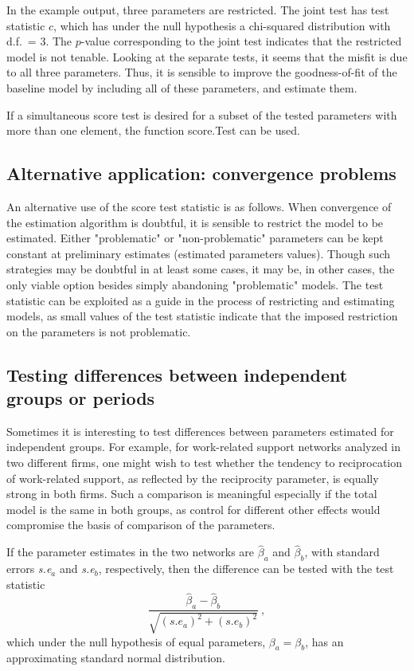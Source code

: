 \documentclass[a4paper,fleqn,11pt]{article}
\newcommand{\+}{\, + \,}
\newcommand{\sfn}[1]{\textsf{#1}}
\begin{document}
In the example output, three parameters are restricted.
The joint test has test statistic $c$, which has under the
null hypothesis a chi-squared distribution with d.f.\ = 3.
The $p$-value corresponding to the joint test indicates
that the restricted model is not tenable. Looking at the separate
tests, it seems that the misfit is due to all three parameters.
Thus, it is sensible to improve
the goodness-of-fit of the baseline model by including all of these parameters,
and estimate them.

If a simultaneous score test is desired for a subset of
the tested parameters with more than one element,
the function \sfn{score.Test} can be used.

\subsection{Alternative application: convergence problems}
\label{alternative}

An alternative use of the score test statistic is as follows. When
convergence of the estimation algorithm is doubtful, it is sensible
to restrict the model to be estimated. Either "problematic" or
"non-problematic" parameters can be kept constant at preliminary
estimates (estimated parameters values). Though such strategies may
be doubtful in at least some cases, it may be, in other cases, the
only viable option besides simply abandoning "problematic" models.
The test statistic can be exploited as a guide in the process of
restricting and estimating models, as small values of the test
statistic indicate that the imposed restriction on the parameters is
not problematic.

\subsection{Testing differences between independent groups or periods}

Sometimes it is interesting to test differences between parameters estimated for
independent groups. For example, for work-related support networks analyzed in
two different firms, one might wish to test whether the tendency to
reciprocation of work-related support, as reflected by the reciprocity
parameter, is equally strong in both firms.  Such a comparison is meaningful
especially if the total model is the same in both groups, as control for
different other effects would compromise the basis of comparison of the
parameters.

If the parameter estimates in the two networks are $\hat\beta_a$ and $\hat\beta_b$,
with standard errors \textit{s.e}$_a$ and  \textit{s.e}$_b$, respectively,
then the difference can be tested with the test statistic
\begin{equation}
    \frac{\hat\beta_a  - \hat\beta_b}{\sqrt{(s.e_a)^2 + (s.e_b)^2}} \ ,
\end{equation}
which under the null hypothesis of equal parameters,
$\beta_a = \beta_b$, has an approximating
standard normal distribution.
\end{document}
